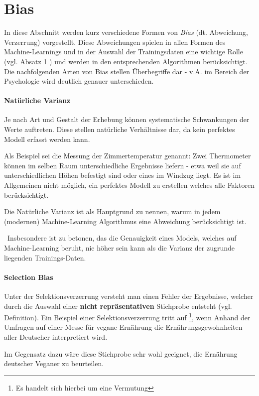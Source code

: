 \section{Bias}
In diese Abschnitt werden kurz verschiedene Formen von \textit{Bias} (dt. Abweichung, Verzerrung) vorgestellt. Diese Abweichungen spielen in allen Formen des Machine-Learnings und in der Auswahl der Trainingsdaten eine wichtige Rolle (vgl. \cite{BiasTypes} Absatz 1 ) und werden in den entsprechenden Algorithmen berücksichtigt. Die nachfolgenden Arten von Bias stellen Überbegriffe dar - v.A. im Bereich der Psychologie wird deutlich genauer unterschieden.

\paragraph{Natürliche Varianz} Je nach Art und Gestalt der Erhebung können systematische Schwankungen der Werte auftreten. Diese stellen natürliche Verhältnisse dar, da kein perfektes Modell erfasst werden kann. 

Als Beispiel sei die Messung der Zimmertemperatur genannt: Zwei Thermometer können im selben Raum unterschiedliche Ergebnisse liefern - etwa weil sie auf unterschiedlichen Höhen befestigt sind oder eines im Windzug liegt. Es ist im Allgemeinen nicht möglich, ein perfektes Modell zu erstellen welches alle Faktoren berücksichtigt.

Die Natürliche Varianz ist als Hauptgrund zu nennen, warum in jedem (modernen) Machine-Learning Algorithmus eine Abweichung berücksichtigt ist.

~\newline Insbesondere ist  zu betonen, das die Genauigkeit eines Models, welches auf Machine-Learning beruht, nie höher sein kann als die Varianz der zugrunde liegenden Trainings-Daten. 
\paragraph{Selection Bias} Unter der Selektionsverzerrung versteht man einen Fehler der Ergebnisse, welcher durch die Auswahl einer \textbf{nicht repräsentativen} Stichprobe entsteht (vgl. \cite{SelectionBias} Definition). Ein Beispiel einer Selektionsverzerrung tritt auf \footnote{Es handelt sich hierbei um eine Vermutung}, wenn Anhand der Umfragen auf einer Messe für vegane Ernährung die Ernährungsgewohnheiten aller Deutscher interpretiert wird. 

Im Gegensatz dazu wäre diese Stichprobe sehr wohl geeignet, die Ernährung deutscher Veganer zu beurteilen.  

